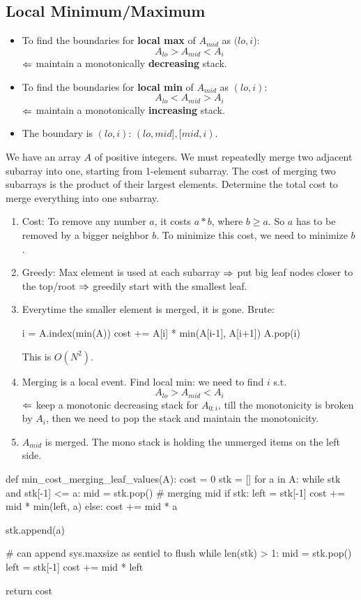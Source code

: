 \subsection{Local Minimum/Maximum}
\begin{itemize}
\item To find the boundaries for \textbf{local max} of $A_{mid}$ as $(lo, i$):
$$
A_{lo} > A_{mid} < A_{i}
$$
$\Leftarrow$ maintain a monotonically \textbf{decreasing} stack. \ 

\item To find the boundaries for \textbf{local min} of $A_{mid}$ as $(lo, i)$:
$$
A_{lo} < A_{mid} > A_{i}
$$
$\Leftarrow$ maintain a monotonically \textbf{increasing} stack. 
\item The boundary is $(lo, i)$: $(lo, mid], [mid, i)$.
\end{itemize}

 We have an array $A$ of positive integers. We must repeatedly merge two adjacent subarray into one, starting from 1-element subarray. The cost of merging two subarrays is the product of their largest elements. Determine the total cost to merge everything into one subarray.

\begin{enumerate}
\item Cost: To remove any number $a$, it costs $a * b$, where $b \geq a$. So $a$ has to be removed by a bigger neighbor $b$. To minimize this cost, we need to minimize $b$.
\item Greedy: Max element is used at each subarray $\Rightarrow$ put big leaf nodes closer to the top/root $\Rightarrow$ greedily start with the smallest leaf.
\item Everytime the smaller element is merged, it is gone. Brute:
\begin{python}
i = A.index(min(A))
cost += A[i] * min(A[i-1], A[i+1])
A.pop(i)
\end{python}
This is $O(N^2)$. 
\item Merging is a local event. Find local min: we need to find $i$ s.t. 
$$A_{lo} > A_{mid} < A_i$$
$\Leftarrow$ keep a monotonic decreasing stack for $A_{0:i}$, till the monotonicity is broken by $A_i$, then we need to pop the stack and maintain the monotonicity. 
\item $A_{mid}$ is merged. The mono stack is holding the unmerged items on the left side.
\end{enumerate}

\begin{python}
def min_cost_merging_leaf_values(A):
    cost = 0
    stk = []
    for a in A:
        while stk and stk[-1] <= a:
            mid = stk.pop()
            # merging mid
            if stk:
                left = stk[-1]
                cost += mid * min(left, a)
            else:
                cost += mid * a
                
        stk.append(a)
    
    # can append sys.maxsize as sentiel to flush 
    while len(stk) > 1:
        mid = stk.pop()
        left = stk[-1]
        cost += mid * left
    
    return cost
\end{python}

